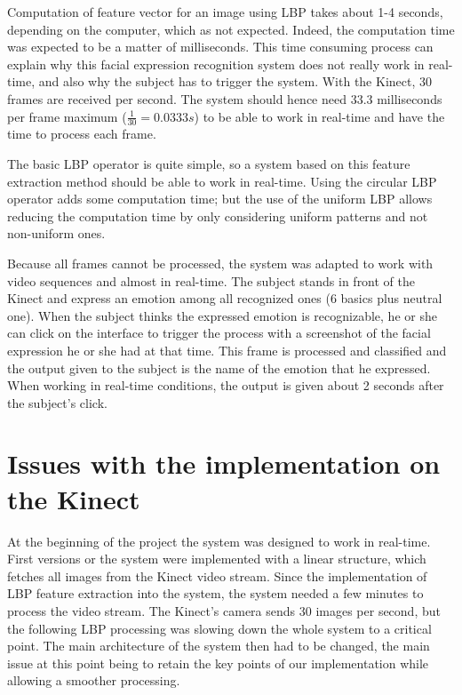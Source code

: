 \vspace{\baselineskip}
\noindent Computation of feature vector for an image using LBP takes about 1-4 seconds, depending on the computer, which as not expected. Indeed, the computation time was expected to be a matter of milliseconds. This time consuming process can explain why this facial expression recognition system does not really work in real-time, and also why the subject has to trigger the system. With the Kinect, 30 frames are received per second. The system should hence need 33.3 milliseconds per frame maximum ($ \frac{1}{30} = 0.0333 s $) to be able to work in real-time and have the time to process each frame. 
\newline

\noindent The basic LBP operator is quite simple, so a system based on this feature extraction method should be able to work in real-time. Using the circular LBP operator adds some computation time; but the use of the uniform LBP allows reducing the computation time by only considering uniform patterns and not non-uniform ones.
\newline

\noindent Because all frames cannot be processed, the system was adapted to work with video sequences and almost in real-time. The subject stands in front of the Kinect and express an emotion among all recognized ones (6 basics plus neutral one). When the subject thinks the expressed emotion is recognizable, he or she can click on the interface to trigger the process with a screenshot of the facial expression he or she had at that time. This frame is processed and classified and the output given to the subject is the name of the emotion that he expressed. When working in real-time conditions, the output is given about 2 seconds after the subject's click.
\newline

\section{Issues with the implementation on the Kinect}
\vspace{\baselineskip}

\noindent At the beginning of the project the system was designed to work in real-time. First versions or the system were implemented with a linear structure, which fetches all images from the Kinect video stream. Since the implementation of LBP feature extraction into the system, the system needed a few minutes to process the video stream. The Kinect's camera sends 30 images per second, but the following LBP processing was slowing down the whole system to a critical point. The main architecture of the system then had to be changed, the main issue at this point being to retain the key points of our implementation while allowing a smoother processing. 
\newline

